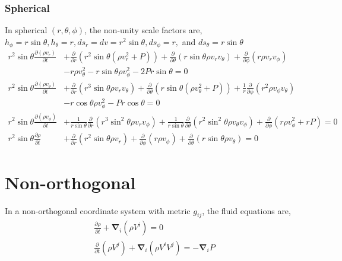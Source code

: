 \documentclass{article}
\newcommand{\pderiv}[1]{\frac{\partial }{\partial #1}}
\newcommand{\ppderiv}[2]{\frac{\partial #1}{\partial #2}}
\newcommand{\del}{\mathbf{\nabla}}
\begin{document}
\subsubsection{Spherical}
In spherical $(r,\theta,\phi)$, the non-unity scale factors are, $h_\phi =r \sin \theta, h_\theta = r, ds_r =dv= r^2 \sin \theta, ds_\phi = r,$ and $ds_\theta = r \sin\theta$
\begin{align}
r^2 \sin \theta \ppderiv{(\rho v_r)}{t} &+ \pderiv{r} \left( r^2 \sin \theta (\rho v_r^2 + P) \right) + \pderiv{\theta} \left( r \sin \theta \rho v_r v_\theta \right) + \pderiv{\phi} \left( r \rho v_r v_\phi \right) \nonumber \\
&- r \rho v_\theta^2 - r \sin \theta \rho v_\phi^2  - 2 P r \sin \theta = 0 \\
r^2 \sin \theta \ppderiv{(\rho v_\theta)}{t} &+ \pderiv{r} \left( r^3 \sin \theta \rho v_r v_\theta \right) + \pderiv{\theta} \left( r \sin \theta ( \rho v_\theta^2 + P) \right) + \frac{1}{r} \pderiv{\phi} \left( r^2 \rho v_\phi v_\theta \right) \nonumber \\ 
&- r \cos \theta \rho v_\phi^2 - P r \cos{\theta} = 0 \\
r^2 \sin \theta \ppderiv{(\rho v_\phi)}{t} &+ \frac{1}{r \sin \theta} \pderiv{r} \left( r^3 \sin^2 \theta \rho v_r v_\phi \right) + \frac{1}{r \sin \theta} \pderiv{\theta} \left( r^2 \sin^2 \theta \rho v_\theta v_\phi \right) + \pderiv{\phi} \left( r \rho v_\phi^2 + r P \right) = 0 \\
r^2 \sin \theta \ppderiv{\rho}{t} &+ \pderiv{r} \left( r^2 \sin \theta \rho v_r \right) + \pderiv{\phi} \left(r \rho v_\phi \right) + \pderiv{\theta} \left(r \sin \theta  \rho v_\theta \right)   = 0
\end{align}


\section{Non-orthogonal}
In a non-orthogonal coordinate system with metric $g_{ij}$, the fluid equations are,
\begin{align}
\ppderiv{\rho}{t} + \del_i \left( \rho V^i \right) = 0 \\
\pderiv{t} (\rho V^j)  + \del_i \left(\rho V^i V^j  \right) = -\del_i P
\end{align}
\end{document}

